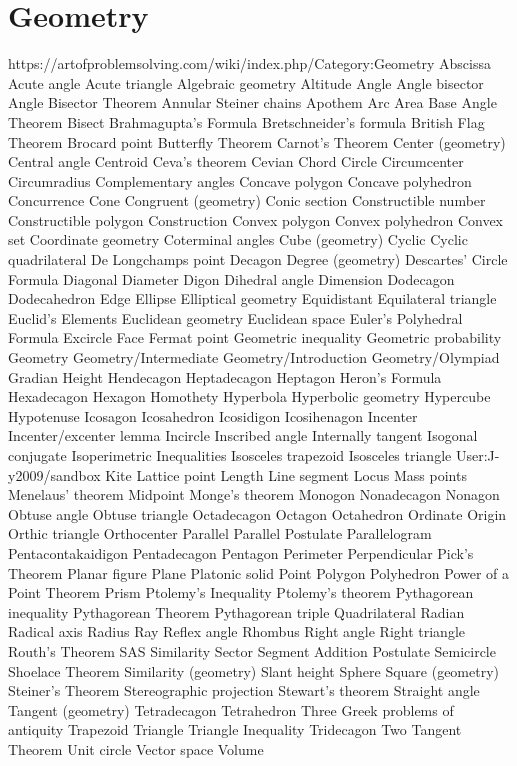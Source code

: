 \section{Geometry}
https://artofproblemsolving.com/wiki/index.php/Category:Geometry
Abscissa
Acute angle
Acute triangle
Algebraic geometry
Altitude
Angle
Angle bisector
Angle Bisector Theorem
Annular Steiner chains
Apothem
Arc
Area
Base Angle Theorem
Bisect
Brahmagupta's Formula
Bretschneider's formula
British Flag Theorem
Brocard point
Butterfly Theorem
Carnot's Theorem
Center (geometry)
Central angle
Centroid
Ceva's theorem
Cevian
Chord
Circle
Circumcenter
Circumradius
Complementary angles
Concave polygon
Concave polyhedron
Concurrence
Cone
Congruent (geometry)
Conic section
Constructible number
Constructible polygon
Construction
Convex polygon
Convex polyhedron
Convex set
Coordinate geometry
Coterminal angles
Cube (geometry)
Cyclic
Cyclic quadrilateral
De Longchamps point
Decagon
Degree (geometry)
Descartes' Circle Formula
Diagonal
Diameter
Digon
Dihedral angle
Dimension
Dodecagon
Dodecahedron
Edge
Ellipse
Elliptical geometry
Equidistant
Equilateral triangle
Euclid's Elements
Euclidean geometry
Euclidean space
Euler's Polyhedral Formula
Excircle
Face
Fermat point
Geometric inequality
Geometric probability
Geometry
Geometry/Intermediate
Geometry/Introduction
Geometry/Olympiad
Gradian
Height
Hendecagon
Heptadecagon
Heptagon
Heron's Formula
Hexadecagon
Hexagon
Homothety
Hyperbola
Hyperbolic geometry
Hypercube
Hypotenuse
Icosagon
Icosahedron
Icosidigon
Icosihenagon
Incenter
Incenter/excenter lemma
Incircle
Inscribed angle
Internally tangent
Isogonal conjugate
Isoperimetric Inequalities
Isosceles trapezoid
Isosceles triangle
User:J-y2009/sandbox
Kite
Lattice point
Length
Line segment
Locus
Mass points
Menelaus' theorem
Midpoint
Monge's theorem
Monogon
Nonadecagon
Nonagon
Obtuse angle
Obtuse triangle
Octadecagon
Octagon
Octahedron
Ordinate
Origin
Orthic triangle
Orthocenter
Parallel
Parallel Postulate
Parallelogram
Pentacontakaidigon
Pentadecagon
Pentagon
Perimeter
Perpendicular
Pick's Theorem
Planar figure
Plane
Platonic solid
Point
Polygon
Polyhedron
Power of a Point Theorem
Prism
Ptolemy's Inequality
Ptolemy's theorem
Pythagorean inequality
Pythagorean Theorem
Pythagorean triple
Quadrilateral
Radian
Radical axis
Radius
Ray
Reflex angle
Rhombus
Right angle
Right triangle
Routh's Theorem
SAS Similarity
Sector
Segment Addition Postulate
Semicircle
Shoelace Theorem
Similarity (geometry)
Slant height
Sphere
Square (geometry)
Steiner's Theorem
Stereographic projection
Stewart's theorem
Straight angle
Tangent (geometry)
Tetradecagon
Tetrahedron
Three Greek problems of antiquity
Trapezoid
Triangle
Triangle Inequality
Tridecagon
Two Tangent Theorem
Unit circle
Vector space
Volume

